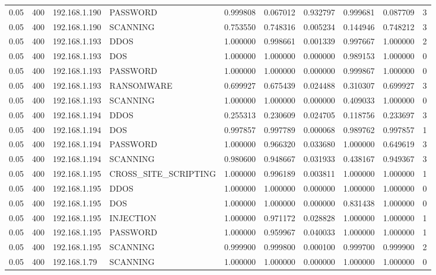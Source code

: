 \begin{tabular}{llllllllll}
0.05 & 400 & 192.168.1.190 & PASSWORD & 0.999808 & 0.067012 & 0.932797 & 0.999681 & 0.087709 & 3 \\
0.05 & 400 & 192.168.1.190 & SCANNING & 0.753550 & 0.748316 & 0.005234 & 0.144946 & 0.748212 & 3 \\
0.05 & 400 & 192.168.1.193 & DDOS & 1.000000 & 0.998661 & 0.001339 & 0.997667 & 1.000000 & 2 \\
0.05 & 400 & 192.168.1.193 & DOS & 1.000000 & 1.000000 & 0.000000 & 0.989153 & 1.000000 & 0 \\
0.05 & 400 & 192.168.1.193 & PASSWORD & 1.000000 & 1.000000 & 0.000000 & 0.999867 & 1.000000 & 0 \\
0.05 & 400 & 192.168.1.193 & RANSOMWARE & 0.699927 & 0.675439 & 0.024488 & 0.310307 & 0.699927 & 3 \\
0.05 & 400 & 192.168.1.193 & SCANNING & 1.000000 & 1.000000 & 0.000000 & 0.409033 & 1.000000 & 0 \\
0.05 & 400 & 192.168.1.194 & DDOS & 0.255313 & 0.230609 & 0.024705 & 0.118756 & 0.233697 & 3 \\
0.05 & 400 & 192.168.1.194 & DOS & 0.997857 & 0.997789 & 0.000068 & 0.989762 & 0.997857 & 1 \\
0.05 & 400 & 192.168.1.194 & PASSWORD & 1.000000 & 0.966320 & 0.033680 & 1.000000 & 0.649619 & 3 \\
0.05 & 400 & 192.168.1.194 & SCANNING & 0.980600 & 0.948667 & 0.031933 & 0.438167 & 0.949367 & 3 \\
0.05 & 400 & 192.168.1.195 & CROSS\_SITE\_SCRIPTING & 1.000000 & 0.996189 & 0.003811 & 1.000000 & 1.000000 & 1 \\
0.05 & 400 & 192.168.1.195 & DDOS & 1.000000 & 1.000000 & 0.000000 & 1.000000 & 1.000000 & 0 \\
0.05 & 400 & 192.168.1.195 & DOS & 1.000000 & 1.000000 & 0.000000 & 0.831438 & 1.000000 & 0 \\
0.05 & 400 & 192.168.1.195 & INJECTION & 1.000000 & 0.971172 & 0.028828 & 1.000000 & 1.000000 & 1 \\
0.05 & 400 & 192.168.1.195 & PASSWORD & 1.000000 & 0.959967 & 0.040033 & 1.000000 & 1.000000 & 1 \\
0.05 & 400 & 192.168.1.195 & SCANNING & 0.999900 & 0.999800 & 0.000100 & 0.999700 & 0.999900 & 2 \\
0.05 & 400 & 192.168.1.79 & SCANNING & 1.000000 & 1.000000 & 0.000000 & 1.000000 & 1.000000 & 0 \\
\bottomrule
\end{tabular}
